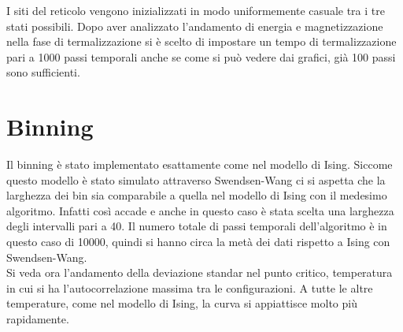 I siti del reticolo vengono inizializzati in modo uniformemente casuale tra i tre stati possibili.
Dopo aver analizzato l'andamento di energia e magnetizzazione nella fase di termalizzazione si è scelto di impostare un tempo di termalizzazione pari a 1000 passi temporali anche se come si può vedere dai grafici, già 100 passi sono sufficienti.

\section{Binning}
Il binning è stato implementato esattamente come nel modello di Ising. Siccome questo modello è stato simulato attraverso Swendsen-Wang ci si aspetta che la larghezza dei bin sia comparabile a quella nel modello di Ising con il medesimo algoritmo. Infatti così accade e anche in questo caso è stata scelta una larghezza degli intervalli pari a 40. Il numero totale di passi temporali dell'algoritmo è in questo caso di 10000, quindi si hanno circa la metà dei dati rispetto a Ising con Swendsen-Wang.\\
Si veda ora l'andamento della deviazione standar nel punto critico, temperatura in cui si ha l'autocorrelazione massima tra le configurazioni. A tutte le altre temperature, come nel modello di Ising, la curva si appiattisce molto più rapidamente.
